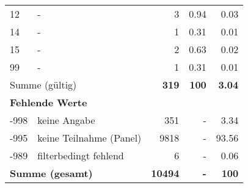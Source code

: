 \begin{longtable}{lXrrr}
     12 &
     \multicolumn{1}{X}{ -  } &


       \num{3} &
       \num[round-mode=places,round-precision=2]{0.94} &
         \num[round-mode=places,round-precision=2]{0.03} \\

     14 &
     \multicolumn{1}{X}{ -  } &


       \num{1} &
       \num[round-mode=places,round-precision=2]{0.31} &
         \num[round-mode=places,round-precision=2]{0.01} \\

     15 &
     \multicolumn{1}{X}{ -  } &


       \num{2} &
       \num[round-mode=places,round-precision=2]{0.63} &
         \num[round-mode=places,round-precision=2]{0.02} \\

     99 &
     \multicolumn{1}{X}{ -  } &


       \num{1} &
       \num[round-mode=places,round-precision=2]{0.31} &
         \num[round-mode=places,round-precision=2]{0.01} \\
     \midrule
     \multicolumn{2}{l}{Summe (gültig)} &
       \textbf{\num{319}} &
     \textbf{\num{100}} &
       \textbf{\num[round-mode=places,round-precision=2]{3.04}} \\
     \multicolumn{5}{l}{\textbf{Fehlende Werte}}\\
       -998 &
       keine Angabe &
         \num{351} &
        - &
         \num[round-mode=places,round-precision=2]{3.34} \\
       -995 &
       keine Teilnahme (Panel) &
         \num{9818} &
        - &
         \num[round-mode=places,round-precision=2]{93.56} \\
       -989 &
       filterbedingt fehlend &
         \num{6} &
        - &
         \num[round-mode=places,round-precision=2]{0.06} \\
     \midrule
     \multicolumn{2}{l}{\textbf{Summe (gesamt)}} &
          \textbf{\num{10494}} &
        \textbf{-} &
        \textbf{\num{100}} \\
     \bottomrule
     \end{longtable}
     
